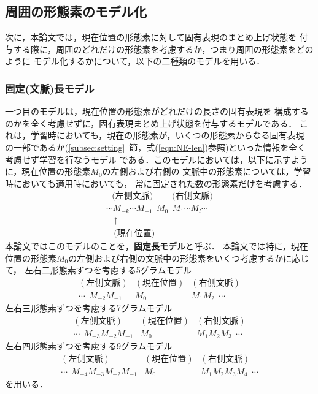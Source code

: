 \subsection{周囲の形態素のモデル化}
\label{subsec:context}

次に，本論文では，現在位置の形態素に対して固有表現のまとめ上げ状態を
付与する際に，周囲のどれだけの形態素を考慮するか，つまり周囲の形態素をどのように
モデル化するかについて，以下の二種類のモデルを用いる．

\subsubsection{固定(文脈)長モデル}
\label{subsubsec:3gram}

一つ目のモデルは，現在位置の形態素がどれだけの長さの固有表現を
構成するのかを全く考慮せずに，固有表現まとめ上げ状態を付与するモデルである．
これは，学習時においても，現在の形態素が，いくつの形態素からなる固有表現
の一部であるか(\ref{subsec:setting}~節，式(\ref{eqn:NE-len})参照)といった情報を全く考慮せず学習を行なうモデル
である．このモデルにおいては，以下に示すように，現在位置の形態素$M_0$の左側および右側の
文脈中の形態素については，学習時においても適用時においても，
常に固定された数の形態素だけを考慮する．
\[
\begin{array}{c}
\ \ \ \mbox{(左側文脈)}\ \ \ \ \  \ \ \ \ \ \mbox{(右側文脈)} \\
\cdots M_{-k}\cdots M_{-1}  \ \ 
	M_{0}\ \ 
         M_{1}\cdots M_{l}\cdots  \\
         \ \ \ \ \uparrow  \\
         \ \ \ \ \mbox{(現在位置)}  
\end{array}
\]
本論文ではこのモデルのことを，{\bf 固定長モデル}と呼ぶ．
本論文では特に，現在位置の形態素$M_0$の左側および右側の文脈中の形態素をいくつ考慮するかに応じて，
左右二形態素ずつを考慮する5グラムモデル
\begin{eqnarray*}
(左側文脈) & (現在位置)  & (右側文脈)  \nonumber \\
\cdots\ \ M_{-2} M_{-1} & 
        M_{0}
        & M_{1} M_2 \ \ \cdots  
\end{eqnarray*}
左右三形態素ずつを考慮する7グラムモデル
\begin{eqnarray*}
(左側文脈) & (現在位置)  & (右側文脈)  \nonumber \\
\cdots\ \ M_{-3} M_{-2} M_{-1} & 
        M_{0}
        & M_{1} M_2 M_3 \ \ \cdots  
\end{eqnarray*}
左右四形態素ずつを考慮する9グラムモデル
\begin{eqnarray*}
(左側文脈) & (現在位置)  & (右側文脈)  \nonumber \\
\cdots\ \ M_{-4} M_{-3} M_{-2} M_{-1} & 
        M_{0}
        & M_{1} M_{2} M_{3} M_4 \ \ \cdots  
\end{eqnarray*}
を用いる．

